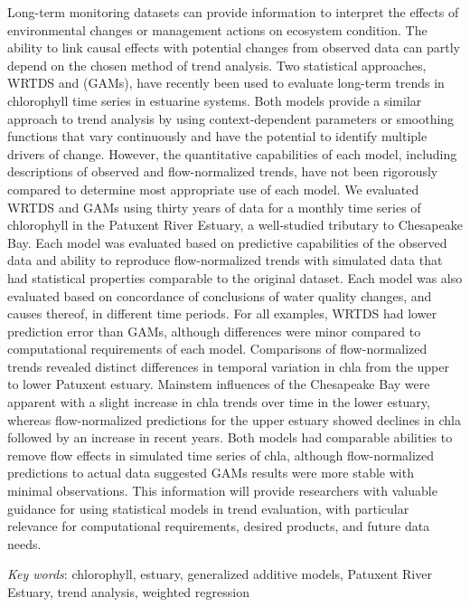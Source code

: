 \documentclass[letterpaper,12pt,oneside]{article}\usepackage[]{graphicx}\usepackage[]{color}
\begin{document}
\noindent Long-term monitoring datasets can provide information to interpret the effects of environmental changes or management actions on ecosystem condition.  The ability to link causal effects with potential changes from observed data can partly depend on the chosen method of trend analysis.  Two statistical approaches, \ac{WRTDS} and  (\acp{GAM}), have recently been used to evaluate long-term trends in chlorophyll time series in estuarine systems.  Both models provide a similar approach to trend analysis by using context-dependent parameters or smoothing functions that vary continuously and have the potential to identify multiple drivers of change.  However, the quantitative capabilities of each model, including descriptions of observed and flow-normalized trends, have not been rigorously compared to determine most appropriate use of each model.  We evaluated \ac{WRTDS} and \acp{GAM} using thirty years of data for a monthly time series of chlorophyll in the Patuxent River Estuary, a well-studied tributary to Chesapeake Bay.  Each model was evaluated based on predictive capabilities of the observed data and ability to reproduce flow-normalized trends with simulated data that had statistical properties comparable to the original dataset.  Each model was also evaluated based on concordance of conclusions of water quality changes, and causes thereof, in different time periods.  For all examples, \ac{WRTDS} had lower prediction error than \acp{GAM}, although differences were minor compared to computational requirements of each model.  Comparisons of flow-normalized trends revealed distinct differences in temporal variation in \ac{chla} from the upper to lower Patuxent estuary.  Mainstem influences of the Chesapeake Bay were apparent with a slight increase in \ac{chla} trends over time in the lower estuary, whereas flow-normalized predictions for the upper estuary showed declines in \ac{chla} followed by an increase in recent years.  Both models had comparable abilities to remove flow effects in simulated time series of \ac{chla}, although flow-normalized predictions to actual data suggested \acp{GAM} results were more stable with minimal observations.  This information will provide researchers with valuable guidance for using statistical models in trend evaluation, with particular relevance for computational requirements, desired products, and future data needs.  

\noindent \textit{Key words}: chlorophyll, estuary, generalized additive models, Patuxent River Estuary, trend analysis, weighted regression
\end{document}
